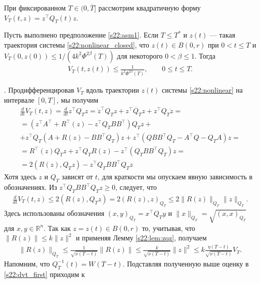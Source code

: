 \documentclass[../main.tex]{subfiles}
\begin{document}
При фиксированном $T\in (0, \overline{T}]$ рассмотрим квадратичную форму $V_T(t,z)=z^{\top}Q_T(t)z$. 
\begin{lemma}\label{s22:lem:vest}
 Пусть выполнено предположение \ref{s22:asm1}. 
Если $T\leqslant T^*$ и $z(t)$ --- такая траектория системы \eqref{s22:nonlinear_closed}, что $z(t) \in B(0,r)$ при $0<t \leqslant T$ и $V_T(0,z(0))\leqslant 1/(4k^2\Phi^{2\beta}(T))$ для некоторого $0<\beta \leqslant 1$. 
 Тогда 
 \begin{gather*}
 V_T(t,z(t)) \leqslant \frac{1}{k^2\Phi^{2\beta}(T)}, \qquad 0 \leqslant t \leqslant T. 
 \end{gather*}
\end{lemma}
\doc. 
Продифференцировав $V_T$ вдоль траектории $z(t)$ системы \eqref{s22:nonlinear} на интервале $[0, T]$, мы получим
\begin{gather*}
 \frac{d}{dt}V_T(t,z) = \frac{d}{dt}z^{\top}Q_Tz = \dot{z}^{\top} Q_T z + z^{\top} \dot{Q_T} z + z^{\top} Q_T \dot{z} = \\
 =\left(z^{\top} A^{\top} + R^{\top}(z)- z^{\top} Q_T B B^{\top}\right) Q_T z + \\ +
 z^{\top} Q_T \left(A +R(z) - B B^{\top} Q_T\right)z + z^{\top} \left(Q B B^{\top} Q_T - A^{\top}Q - Q_T A \right) z = \\
 = R^{\top}(z)Q_T z + z^{\top} Q_T R(z) - z^{\top} (Q_T B B^{\top} Q_T) z = \\
 = 2 \left( R(z), Q_Tz \right) - z^{\top} Q_T B B^{\top} Q_T z 
\end{gather*}
Хотя здесь $z$ и $Q_T$ зависят от $t$, для краткости мы опускаем явную зависимость в обозначениях. 
Из $z^{\top} Q_T B B^{\top} Q_T z\geqslant 0$, следует, что
\begin{gather}\label{s22:dvt_first}
 \frac{d}{dt}V_T(t,z) \leqslant 2 \left( R(z), Q_T z\right)=2(R(z),z)_{Q_T} \leqslant 2 \| R(z) \|_{Q_T} \| z \|_{Q_T}.
\end{gather}
Здесь использованы обозначения $(x,y)_{Q_T}=x^\top Q_Ty$ и $\| x \|_{Q_T} =\sqrt{(x,x)_{Q_T}}$ для $x,y\in \mathbb R^n$. 
Так как $z = z(t) \in B(0,r)$ то, учитывая, что $\|R(z)\| \leqslant k\|z\|^2$ и применяя Лемму \ref{s22:lem:zqz}, получаем 
\begin{gather}\label{s22:rqr_est}
 \| R(z) \|_{Q_T} \leqslant \frac{1}{\sqrt{\nu(T - t)}} \|R(z)\| \leqslant \frac{k}{\sqrt{\nu(T - t)}}\|z\|^2 \leqslant k \frac{\eta(T-t)}{\sqrt{\nu(T-t)}}V_T.
\end{gather}
Напомним, что $ Q_T^{-1}(t) = W(T-t) $.
Подставляя полученную выше оценку в \eqref{s22:dvt_first} приходим к
\end{document}
